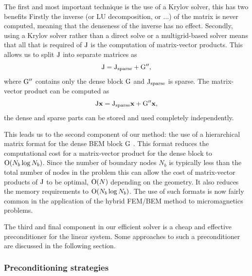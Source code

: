 The first and most important technique is the use of a Krylov solver, this has two benefits
Firstly the inverse (or LU decomposition, or ...) of the matrix is never computed, meaning that the denseness of the inverse has no effect.
Secondly, using a Krylov solver rather than a direct solve or a multigrid-based solver means that all that is required of $\mathrm{J}$ is the computation of matrix-vector products.
This allows us to split $\mathrm{J}$ into separate matrices as
\begin{equation}
  \mathrm{J} = \mathrm{J}_{\textrm{sparse}} + \mathrm{G}'',
\end{equation}
where $\mathrm{G}''$ contains only the dense block $\mathrm{G}$ and $\mathrm{J}_{\textrm{sparse}}$ is sparse.
The matrix-vector product can be computed as
\begin{equation}
  \mathrm{J} \boldsymbol{\mathrm{x}} = \mathrm{J}_{\textrm{sparse}}\boldsymbol{\mathrm{x}} + \mathrm{G}''\boldsymbol{\mathrm{x}},
\end{equation}
\ie the dense and sparse parts can be stored and used completely independently.

This leads us to the second component of our method: the use of a hierarchical matrix format for the dense BEM block $\mathrm{G}$ \cite{Borm2003,Forster2003,Knittel2011}.
This format reduces the computational cost for a matrix-vector product for the dense block to $\mathrm{O}{\left( N_b \log N_b \right)}$.
Since the number of boundary nodes $N_b$ is typically less than the total number of nodes in the problem this can allow the cost of matrix-vector products of $\mathrm{J}$ to be optimal, \ie $\mathrm{O}{\left( N \right)}$ depending on the geometry.
It also reduces the memory requirements to $\mathrm{O}{\left( N_b \log N_b \right)}$.
The use of such formats is now fairly common in the application of the hybrid FEM/BEM method to micromagnetics problems.

The third and final component in our efficient solver is a cheap and effective preconditioner for the linear system.
Some approaches to such a preconditioner are discussed in the following section.


\subsubsection{Preconditioning strategies}
\label{sec:bem-solver-strategies}

\newcommand{\preca}{\mathcal{P}}
\newcommand{\precb}{\mathcal{Q}}
\newcommand{\precc}{\mathcal{R}}


\newcommand{\inexact}[1]{\widetilde{#1}}
\newcommand{\parinexact}[1]{\hat{#1}}
\newcommand{\pbin}{\inexact{\precb}}
\newcommand{\pcin}{\inexact{\precc}}




